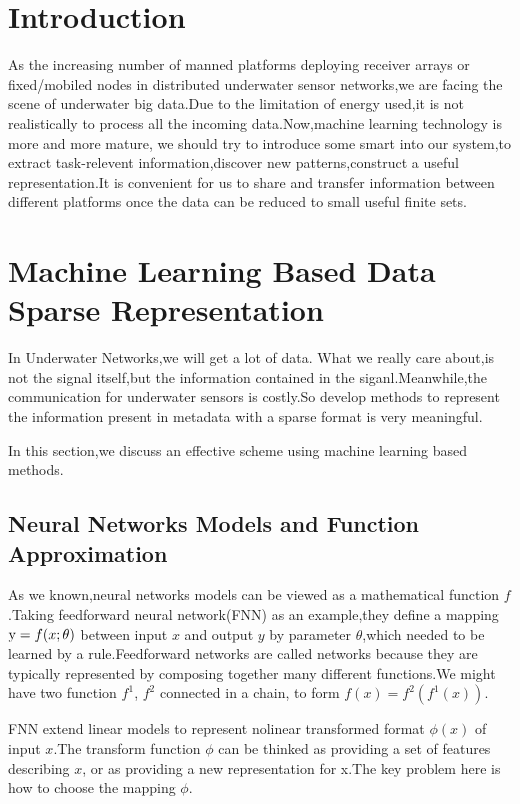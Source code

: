 \section{Introduction}
As the increasing number of manned platforms deploying receiver arrays or  fixed/mobiled nodes in distributed underwater sensor networks,we are facing the scene of underwater big data.Due to the limitation of energy used,it is not realistically to process all the incoming data\cite{Yang2015Issues}.Now,machine learning technology is more and more mature, we should try to introduce some smart into our system,to extract task-relevent information,discover new patterns,construct a useful representation.It is convenient for us to share and transfer information between different platforms once the data can be reduced to small useful finite sets.

\section{Machine Learning Based Data Sparse Representation}
In Underwater Networks,we will get a lot of data. What we really care about,is not the signal itself,but the information contained in the siganl.Meanwhile,the communication for underwater sensors is costly.So develop methods to represent the information present in metadata with a sparse format is very meaningful.

In this section,we discuss an effective scheme using machine learning based methods.

\subsection{Neural Networks Models and Function Approximation}
As we known,neural networks models can be viewed as a mathematical function $f$.Taking feedforward neural network(FNN) as an example,they define a mapping ${\rm{y}}=f(x;\theta )$ between input $x$ and output $y$ by parameter $\theta$,which needed to be learned by a rule.Feedforward networks are called networks because they are typically represented by composing together many different functions.We might have two function $f^{1}$, $f^{2}$ connected in a chain\cite{goodfellow2016deep}, to form
$f(x) = f^{2}(f^{1}(x))$.

FNN extend linear models to represent nolinear transformed format $\phi(x)$ of input $x$.The transform function $\phi$ can be thinked as providing a set of features describing $x$, or as providing a new representation for x.The key problem here is how to choose the mapping $\phi$.

